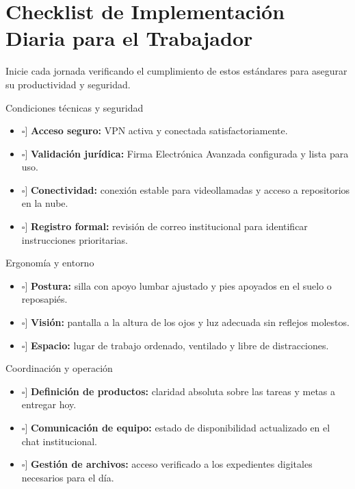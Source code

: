 \documentclass[11pt,letterpaper]{article}
\newcommand{\checkbox}{\makebox[1.2em][l]{$\square$}}
\newcommand{\strong}[1]{\textbf{\textcolor{AzulProfundo}{#1}}}
\begin{document}
\section{Checklist de Implementación Diaria para el Trabajador}

Inicie cada jornada verificando el cumplimiento de estos estándares para asegurar su productividad y seguridad.

\begin{KeyBox}{Condiciones técnicas y seguridad}
\begin{itemize}
    \item[\checkbox] \strong{Acceso seguro:} VPN activa y conectada satisfactoriamente.
    \item[\checkbox] \strong{Validación jurídica:} Firma Electrónica Avanzada configurada y lista para uso.
    \item[\checkbox] \strong{Conectividad:} conexión estable para videollamadas y acceso a repositorios en la nube.
    \item[\checkbox] \strong{Registro formal:} revisión de correo institucional para identificar instrucciones prioritarias.
\end{itemize}
\end{KeyBox}

\begin{KeyBox}{Ergonomía y entorno}
\begin{itemize}
    \item[\checkbox] \strong{Postura:} silla con apoyo lumbar ajustado y pies apoyados en el suelo o reposapiés.
    \item[\checkbox] \strong{Visión:} pantalla a la altura de los ojos y luz adecuada sin reflejos molestos.
    \item[\checkbox] \strong{Espacio:} lugar de trabajo ordenado, ventilado y libre de distracciones.
\end{itemize}
\end{KeyBox}

\begin{KeyBox}{Coordinación y operación}
\begin{itemize}
    \item[\checkbox] \strong{Definición de productos:} claridad absoluta sobre las tareas y metas a entregar hoy.
    \item[\checkbox] \strong{Comunicación de equipo:} estado de disponibilidad actualizado en el chat institucional.
    \item[\checkbox] \strong{Gestión de archivos:} acceso verificado a los expedientes digitales necesarios para el día.
\end{itemize}
\end{KeyBox}
\end{document}
